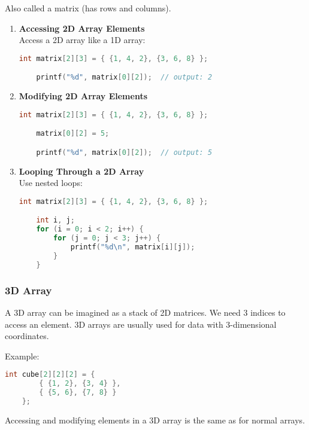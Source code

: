 Also called a matrix (has rows and columns).

\begin{enumerate}[label={}, leftmargin=*]
	\item \textbf{Accessing 2D Array Elements}\\
	Access a 2D array like a 1D array:

	\begin{lstlisting}[language=c]
	int matrix[2][3] = { {1, 4, 2}, {3, 6, 8} };

	printf("%d", matrix[0][2]);  // output: 2
	\end{lstlisting}
	
	\item \textbf{Modifying 2D Array Elements}
	\begin{lstlisting}[language=c]
	int matrix[2][3] = { {1, 4, 2}, {3, 6, 8} };

	matrix[0][2] = 5;

	printf("%d", matrix[0][2]);  // output: 5
	\end{lstlisting}
	
	\item \textbf{Looping Through a 2D Array}\\
	Use nested loops:

	\begin{lstlisting}[language=c]
	int matrix[2][3] = { {1, 4, 2}, {3, 6, 8} };

	int i, j;
	for (i = 0; i < 2; i++) {
		for (j = 0; j < 3; j++) {
			printf("%d\n", matrix[i][j]);
		}
	}
	\end{lstlisting}
\end{enumerate}

\subsubsection{3D Array}

A 3D array can be imagined as a stack of 2D matrices.  
We need 3 indices to access an element.  
3D arrays are usually used for data with 3-dimensional coordinates.

Example:
\begin{lstlisting}[language=c]
	int cube[2][2][2] = {
		{ {1, 2}, {3, 4} },
		{ {5, 6}, {7, 8} }
	};
\end{lstlisting}

Accessing and modifying elements in a 3D array is the same as for normal arrays.

